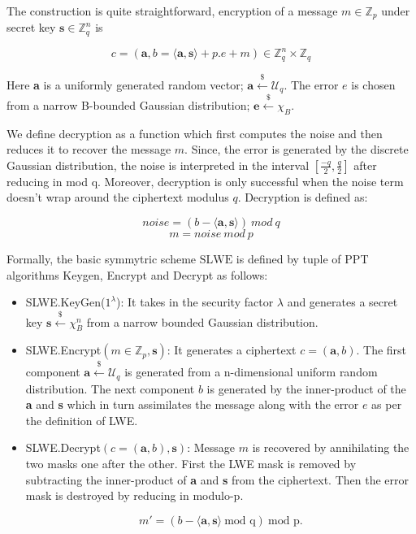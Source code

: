 \documentclass[10pt,journal,compsoc]{IEEEtran}
\theoremstyle{definition}
\begin{document}
The construction is quite straightforward, encryption of a message $m \in \mathbb{Z}_p$ under secret key $\textbf{s} \in \mathbb{Z}_q^n$ is

$$c = \left( \textbf{a},b = \langle \textbf{a},\textbf{s}\rangle + p.e + m\right) \in \mathbb{Z}_q^n \times \mathbb{Z}_q $$

Here \textbf{a} is a uniformly generated random vector; $\textbf{a} \xleftarrow{\$} \mathcal{U}_q$. The error $e$ is chosen from a narrow B-bounded Gaussian distribution; $\textbf{e} \xleftarrow{\$} \chi_B $.  

We define decryption as a function which first computes the noise and then reduces it to recover the message $m$. Since, the error is generated by the discrete Gaussian distribution, the noise is interpreted in the interval $\left[ \frac{-q}{2},\frac{q}{2}\right]$ after reducing in mod q. Moreover, decryption is only successful when the noise term doesn't wrap around the ciphertext modulus $q$. Decryption is defined as:

$$noise = \left( b - \langle \textbf{a},\textbf{s}\rangle \right) \ mod \ q $$
$$ m = noise \ mod \ p$$

 Formally, the basic symmytric scheme $\textrm{SLWE}$ is defined by tuple of PPT algorithms Keygen, Encrypt and Decrypt as follows:
 
 \begin{itemize}
 
 \item SLWE.KeyGen($1^\lambda$): It takes in the security factor $\lambda$ and generates a secret key $\textbf{s} \xleftarrow{\$} \chi_B^n $ from a narrow bounded Gaussian distribution.
 
 \item SLWE.Encrypt$\left( m \in \mathbb{Z}_p, \textbf{s}\right)$: It generates a ciphertext $c = \left( \textbf{a}, b \right)$. The first component $\textbf{a} \xleftarrow{\$} \mathcal{U}_q$ is generated from a n-dimensional uniform random distribution. The next component $b$ is generated by the inner-product of the \textbf{a} and \textbf{s} which in turn assimilates the message along with the error $e$ as per the definition of LWE.   
 
\item SLWE.Decrypt$\left(c = \left(\textbf{a},b\right), \textbf{s}\right)$: Message $m$ is recovered by annihilating the two masks one after the other. First the LWE mask is removed by subtracting the inner-product of \textbf{a} and \textbf{s} from the ciphertext. Then the error mask is destroyed by reducing in modulo-p.

$$m' =\left(  b - \langle \textbf{a},\textbf{s} \rangle \ \textrm{mod q} \right) \ \textrm{mod p}.$$ 
 \end{itemize}
 
\end{document}
